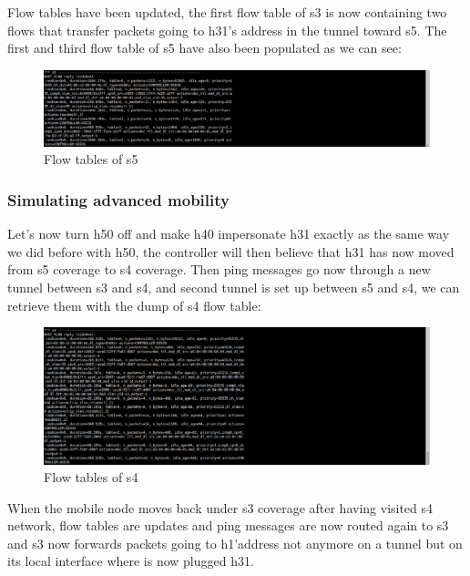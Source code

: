 \documentclass{article}
\begin{document}
Flow tables have been updated, the first flow table of s3 is now
containing two flows that transfer packets going to h31's address in
the tunnel toward s5. The first and third flow table of s5 have
also been populated as we can see:

\begin{figure}[h!]
  \centering
    \includegraphics[trim = 0mm 0mm 237mm 0mm,clip,scale=0.5]{reportPictures/s5_dumpflows.png}
  \caption{Flow tables of s5}
\end{figure}

\newpage

\subsubsection{Simulating advanced mobility}

Let's now turn h50 off and make h40 impersonate h31 exactly as the same
way we did before with h50, the controller will then believe that h31
has now moved from s5 coverage to s4 coverage.  Then ping messages go
now through a new tunnel between s3 and s4, and second tunnel is set
up between s5 and s4, we can retrieve them with the dump of s4 flow
table:

\begin{figure}[h!]
  \centering
    \includegraphics[trim = 0mm 0mm 237mm 0mm,clip,scale=0.5]{reportPictures/s4_dumpflows.png}
  \caption{Flow tables of s4}
\end{figure}


When the mobile node moves back under s3 coverage after having
visited s4 network, flow tables are updates and ping messages are now
routed again to s3 and s3 now forwards packets going to h1'address
not anymore on a tunnel but on its local interface where is now
plugged h31.
\end{document}
